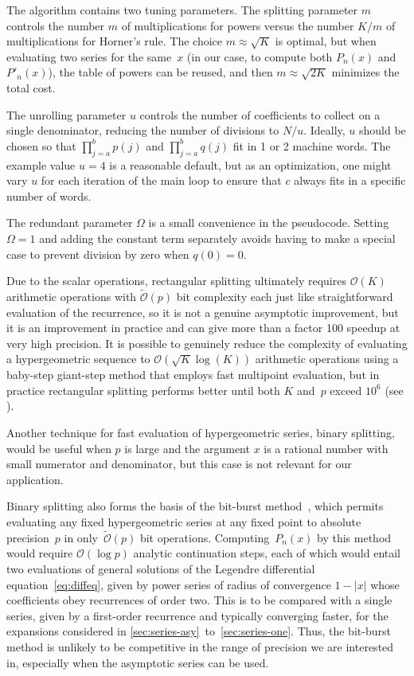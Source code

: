 \documentclass[nohypdvips,review]{siamart0216}
\newcommand{\OO}{\mathcal{O}}
\newcommand{\OOtilde}{\widetilde{\mathcal{O}}}
\begin{document}
The algorithm contains two tuning parameters.
The splitting parameter $m$ controls the
number $m$ of multiplications for powers versus the number $K / m$ of
multiplications for Horner's rule.
The choice $m \approx \sqrt K$ is optimal,
but when evaluating two series for the same~$x$
(in our case, to compute both $P_n(x)$ and $P'_n(x)$),
the table of powers can be reused,
and then $m \approx \sqrt{2K}$ minimizes the total cost.

The unrolling parameter $u$ controls the number of coefficients
to collect on a single denominator, reducing the
number of divisions to $N / u$.
Ideally, $u$ should be chosen
so that $\prod_{j=a}^b p(j)$
and $\prod_{j=a}^b q(j)$ fit in 1 or 2 machine words.
The example value $u = 4$ is a reasonable
default, but as an optimization, one might vary $u$
for each iteration of the main loop
to ensure that $c$ always fits in a specific number of words.

The redundant parameter $\Omega$ is a small convenience in the pseudocode.
Setting $\Omega = 1$ and adding the constant term separately
avoids having to make a special case to prevent division by zero
when $q(0) = 0$.

Due to the scalar operations, rectangular splitting ultimately
requires $\OO(K)$ arithmetic operations with $\OOtilde(p)$ bit complexity
each
just like straightforward evaluation of the recurrence, so it is
not a genuine asymptotic improvement, but
it is an improvement in practice and
can give more than a factor 100 speedup at very high precision.
It is possible to genuinely reduce the complexity of evaluating
a hypergeometric sequence to $\OO(\sqrt{K} \log(K))$ arithmetic
operations using a baby-step giant-step method
that employs fast multipoint evaluation,
but in practice rectangular splitting
performs better until both $K$ and~$p$
exceed $10^6$ (see \cite{Johansson2014rectangular}).

Another technique for fast evaluation of hypergeometric series,
binary splitting, would be useful when $p$ is large and the
argument $x$ is a rational number with small numerator and denominator,
but this case is not relevant for our application.

Binary splitting also forms the basis of the bit-burst
method~\cite[Section 4]{ChudnovskyChudnovsky1990}, which permits
evaluating any fixed hypergeometric series at any fixed point to
absolute precision~$p$ in only~$\OOtilde(p)$ bit operations.
Computing~$P_n(x)$ by this method would require $\OO(\log p)$ analytic
continuation steps, each of which would entail two evaluations of
general solutions of the Legendre differential equation~\cref{eq:diffeq}, given by
power series of radius of convergence $1 - |x|$ whose coefficients
obey recurrences of order two.
This is to be compared with a single series, given by a first-order
recurrence and typically converging faster, for the expansions
considered in \cref{sec:series-asy}~to~\cref{sec:series-one}.
Thus, the bit-burst method is unlikely to be competitive in the range
of precision we are interested in, especially when the asymptotic
series can be used.
\end{document}
